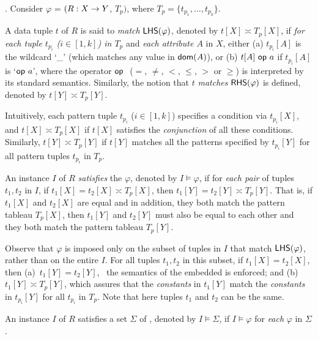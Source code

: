 . Consider \pCFD $\varphi$ =
$(R:X\rightarrow Y$, $T_p)$, where $T_p = \{t_{p_1}, \ldots, t_{p_k}\}$.

A data tuple $t$ of $R$ is said to {\em match} ${\mathsf{LHS}}(\varphi)$,
denoted by $t[X] \asymp T_p[X]$, if {\em for each tuple
$t_{p_i}$ ($i\in[1, k]$) in $T_p$} and {\em each attribute $A$} in $X$, either
(a)  $t_{p_i}[A]$ is the wildcard `\_' (which matches any value
in $\protect\mathsf{dom}(A)$),  or
(b) $t[A]\ \op a$ if $t_{p_i}[A]$ is `$\op a$', where
the operator $\op$ ($=$, $\ne$,
$<$, $\le$, $>$ or $\ge$) is interpreted by its standard
semantics. Similarly, the notion that $t$ {\em matches} ${\mathsf{RHS}}(\varphi)$
is defined, denoted by $t[Y] \asymp T_p[Y]$.


Intuitively, each pattern tuple $t_{p_i}$ ($i\in[1, k]$) specifies a condition via
$t_{p_i}[X]$, and $t[X] \asymp T_p[X]$ if
 $t[X]$ satisfies the {\em conjunction} of all these conditions.
Similarly, $t[Y] \asymp T_p[Y]$ if $t[Y]$ matches all the patterns
specified by $t_{p_i}[Y]$ for all pattern tuples $t_{p_i}$ in $T_p$.

An instance $I$ of $R$ {\em satisfies} the \pCFD $\varphi$, denoted
by $I \models \varphi$, if  for {\em each pair} of tuples $t_1, t_2$
in $I$, if $t_1[X] = t_2[X] \asymp T_p[X]$, then
$t_1[Y] = t_2[Y] \asymp T_p[Y]$.  That is, if $t_1[X]$ and $t_2[X]$
are equal and in addition, they both match the pattern tableau
$T_p[X]$, then $t_1[Y]$ and $t_2[Y]$ must also be equal to each
other and they both match the pattern tableau $T_p[Y]$.

Observe that $\varphi$ is imposed only on the subset of tuples in
$I$ that match ${\mathsf{LHS}}(\varphi)$, rather than on the entire $I$. For
all tuples $t_1, t_2$ in this subset, if $t_1[X] = t_2[X]$, then
(a)~$t_1[Y] = t_2[Y]$, \ie~the semantics of the embedded \FDs is
enforced; and (b)~$t_1[Y] \asymp T_p[Y]$, which assures that the
{\em constants} in $t_1[Y]$ match the {\em constants} in $t_{p_i}[Y]$
for all $t_{p_i}$ in $T_p$. Note that here tuples $t_1$ and $t_2$ can
be the same.



An instance $I$ of $R$ satisfies a set $\Sigma$ of \pCFDs,
denoted by $I\models\Sigma$, if $I\models\varphi$ for {\em each}
\pCFD $\varphi$ in $\Sigma$.


